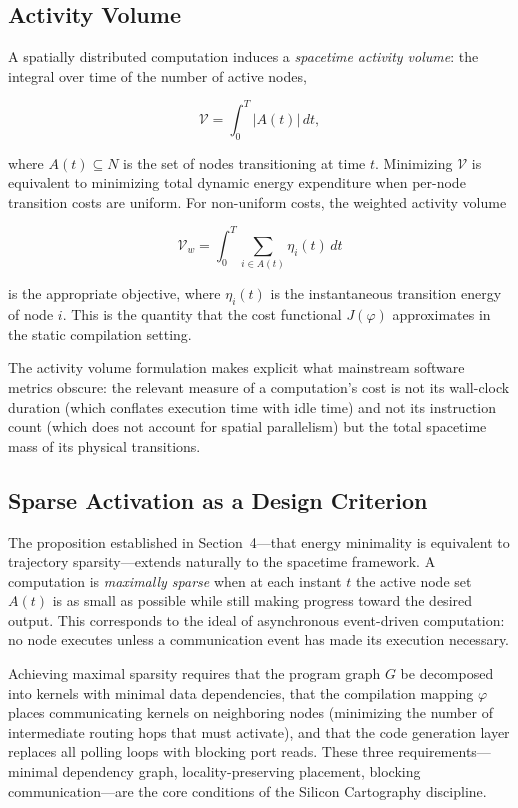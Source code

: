 \documentclass[11pt, a4paper]{article}
\begin{document}
\subsection{Activity Volume}

A spatially distributed computation induces a \emph{spacetime activity volume}:
the integral over time of the number of active nodes,

\[
\mathcal{V} = \int_0^T |A(t)|\, dt,
\]

where $A(t) \subseteq N$ is the set of nodes transitioning at time $t$. Minimizing
$\mathcal{V}$ is equivalent to minimizing total dynamic energy expenditure when
per-node transition costs are uniform. For non-uniform costs, the weighted
activity volume

\[
\mathcal{V}_w = \int_0^T \sum_{i \in A(t)} \eta_i(t)\, dt
\]

is the appropriate objective, where $\eta_i(t)$ is the instantaneous transition
energy of node $i$. This is the quantity that the cost functional $J(\varphi)$
approximates in the static compilation setting.

The activity volume formulation makes explicit what mainstream software metrics
obscure: the relevant measure of a computation's cost is not its wall-clock
duration (which conflates execution time with idle time) and not its
instruction count (which does not account for spatial parallelism) but the
total spacetime mass of its physical transitions.

\subsection{Sparse Activation as a Design Criterion}

The proposition established in Section~4---that energy minimality is equivalent
to trajectory sparsity---extends naturally to the spacetime framework.
A computation is \emph{maximally sparse} when at each instant $t$ the active
node set $A(t)$ is as small as possible while still making progress toward
the desired output. This corresponds to the ideal of asynchronous event-driven
computation: no node executes unless a communication event has made its
execution necessary.

Achieving maximal sparsity requires that the program graph $G$ be decomposed
into kernels with minimal data dependencies, that the compilation mapping
$\varphi$ places communicating kernels on neighboring nodes (minimizing
the number of intermediate routing hops that must activate), and that
the code generation layer replaces all polling loops with blocking port reads.
These three requirements---minimal dependency graph, locality-preserving placement,
blocking communication---are the core conditions of the Silicon Cartography discipline.
\end{document}
